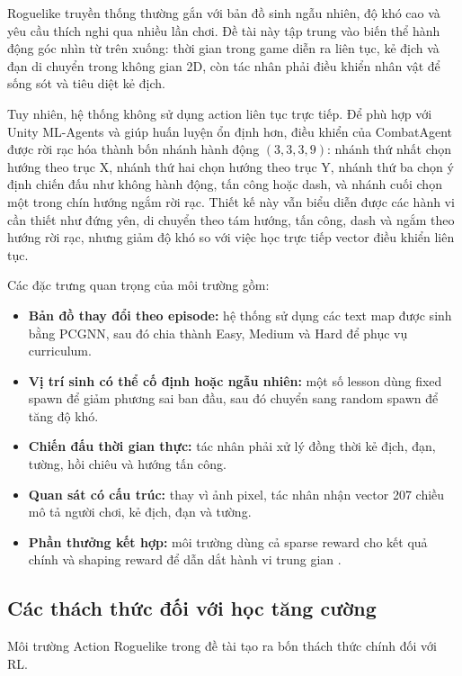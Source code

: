 Roguelike truyền thống thường gắn với bản đồ sinh ngẫu nhiên, độ khó cao và yêu cầu thích nghi qua nhiều lần chơi. Đề tài này tập trung vào biến thể hành động góc nhìn từ trên xuống: thời gian trong game diễn ra liên tục, kẻ địch và đạn di chuyển trong không gian 2D, còn tác nhân phải điều khiển nhân vật để sống sót và tiêu diệt kẻ địch.

Tuy nhiên, hệ thống không sử dụng action liên tục trực tiếp. Để phù hợp với Unity ML-Agents và giúp huấn luyện ổn định hơn, điều khiển của CombatAgent được rời rạc hóa thành bốn nhánh hành động $(3,3,3,9)$: nhánh thứ nhất chọn hướng theo trục X, nhánh thứ hai chọn hướng theo trục Y, nhánh thứ ba chọn ý định chiến đấu như không hành động, tấn công hoặc dash, và nhánh cuối chọn một trong chín hướng ngắm rời rạc. Thiết kế này vẫn biểu diễn được các hành vi cần thiết như đứng yên, di chuyển theo tám hướng, tấn công, dash và ngắm theo hướng rời rạc, nhưng giảm độ khó so với việc học trực tiếp vector điều khiển liên tục.

Các đặc trưng quan trọng của môi trường gồm:

\begin{itemize}
    \item \textbf{Bản đồ thay đổi theo episode:} hệ thống sử dụng các text map được sinh bằng PCGNN, sau đó chia thành Easy, Medium và Hard để phục vụ curriculum.
    \item \textbf{Vị trí sinh có thể cố định hoặc ngẫu nhiên:} một số lesson dùng fixed spawn để giảm phương sai ban đầu, sau đó chuyển sang random spawn để tăng độ khó.
    \item \textbf{Chiến đấu thời gian thực:} tác nhân phải xử lý đồng thời kẻ địch, đạn, tường, hồi chiêu và hướng tấn công.
    \item \textbf{Quan sát có cấu trúc:} thay vì ảnh pixel, tác nhân nhận vector 207 chiều mô tả người chơi, kẻ địch, đạn và tường.
    \item \textbf{Phần thưởng kết hợp:} môi trường dùng cả sparse reward cho kết quả chính và shaping reward để dẫn dắt hành vi trung gian \cite{Ibrahim2024}.
\end{itemize}

\subsection{Các thách thức đối với học tăng cường}

Môi trường Action Roguelike trong đề tài tạo ra bốn thách thức chính đối với RL.

